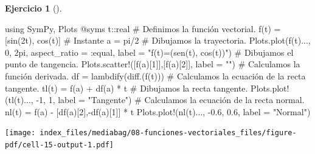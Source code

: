 \documentclass[
  a4paper,
]{scrreport}
\newenvironment{Shaded}{\begin{snugshade}}{\end{snugshade}}
\newcommand{\BuiltInTok}[1]{\textcolor[rgb]{0.00,0.23,0.31}{#1}}
\newcommand{\CommentTok}[1]{\textcolor[rgb]{0.37,0.37,0.37}{#1}}
\newcommand{\ConstantTok}[1]{\textcolor[rgb]{0.56,0.35,0.01}{#1}}
\newcommand{\DataTypeTok}[1]{\textcolor[rgb]{0.68,0.00,0.00}{#1}}
\newcommand{\FloatTok}[1]{\textcolor[rgb]{0.68,0.00,0.00}{#1}}
\newcommand{\FunctionTok}[1]{\textcolor[rgb]{0.28,0.35,0.67}{#1}}
\newcommand{\ImportTok}[1]{\textcolor[rgb]{0.00,0.46,0.62}{#1}}
\newcommand{\NormalTok}[1]{\textcolor[rgb]{0.00,0.23,0.31}{#1}}
\newcommand{\OperatorTok}[1]{\textcolor[rgb]{0.37,0.37,0.37}{#1}}
\newcommand{\PreprocessorTok}[1]{\textcolor[rgb]{0.68,0.00,0.00}{#1}}
\newcommand{\StringTok}[1]{\textcolor[rgb]{0.13,0.47,0.30}{#1}}
\theoremstyle{definition}
\newtheorem{exercise}{Ejercicio}[chapter]
\theoremstyle{remark}
\begin{document}
\begin{exercise}[]
\begin{enumerate}
\begin{tcolorbox}
\begin{Shaded}
\begin{Highlighting}[]
\ImportTok{using} \BuiltInTok{SymPy}\NormalTok{, }\BuiltInTok{Plots}
\PreprocessorTok{@syms}\NormalTok{ t}\OperatorTok{::}\DataTypeTok{real}
\CommentTok{\# Definimos la función vectorial.}
\FunctionTok{f}\NormalTok{(t) }\OperatorTok{=}\NormalTok{ [}\FunctionTok{sin}\NormalTok{(}\FloatTok{2}\NormalTok{t), }\FunctionTok{cos}\NormalTok{(t)]}
\CommentTok{\# Instante }
\NormalTok{a }\OperatorTok{=} \ConstantTok{pi}\OperatorTok{/}\FloatTok{2}
\CommentTok{\# Dibujamos la trayectoria.}
\NormalTok{Plots.}\FunctionTok{plot}\NormalTok{(}\FunctionTok{f}\NormalTok{(t)}\OperatorTok{...}\NormalTok{, }\FloatTok{0}\NormalTok{, }\FloatTok{2}\NormalTok{pi, aspect\_ratio }\OperatorTok{=} \OperatorTok{:}\NormalTok{equal, label }\OperatorTok{=} \StringTok{"f(t)=(sen(t), cos(t))"}\NormalTok{)}
\CommentTok{\# Dibujamos el punto de tangencia.}
\NormalTok{Plots.}\FunctionTok{scatter!}\NormalTok{([}\FunctionTok{f}\NormalTok{(a)[}\FloatTok{1}\NormalTok{]],[}\FunctionTok{f}\NormalTok{(a)[}\FloatTok{2}\NormalTok{]], label }\OperatorTok{=} \StringTok{""}\NormalTok{)}
\CommentTok{\# Calculamos la función derivada.}
\NormalTok{df }\OperatorTok{=} \FunctionTok{lambdify}\NormalTok{(}\FunctionTok{diff}\NormalTok{.(}\FunctionTok{f}\NormalTok{(t)))}
\CommentTok{\# Calculamos la ecuación de la recta tangente.}
\FunctionTok{tl}\NormalTok{(t) }\OperatorTok{=} \FunctionTok{f}\NormalTok{(a) }\OperatorTok{+} \FunctionTok{df}\NormalTok{(a) }\OperatorTok{*}\NormalTok{ t}
\CommentTok{\# Dibujamos la recta tangente.}
\NormalTok{Plots.}\FunctionTok{plot!}\NormalTok{(}\FunctionTok{tl}\NormalTok{(t)}\OperatorTok{...}\NormalTok{, }\OperatorTok{{-}}\FloatTok{1}\NormalTok{, }\FloatTok{1}\NormalTok{, label }\OperatorTok{=} \StringTok{"Tangente"}\NormalTok{)}
\CommentTok{\# Calculamos la ecuación de la recta normal.}
\FunctionTok{nl}\NormalTok{(t) }\OperatorTok{=} \FunctionTok{f}\NormalTok{(a) }\OperatorTok{{-}}\NormalTok{ [}\FunctionTok{df}\NormalTok{(a)[}\FloatTok{2}\NormalTok{],}\FunctionTok{{-}df}\NormalTok{(a)[}\FloatTok{1}\NormalTok{]] }\OperatorTok{*}\NormalTok{ t}
\NormalTok{Plots.}\FunctionTok{plot!}\NormalTok{(}\FunctionTok{nl}\NormalTok{(t)}\OperatorTok{...}\NormalTok{, }\OperatorTok{{-}}\FloatTok{0.6}\NormalTok{, }\FloatTok{0.6}\NormalTok{, label }\OperatorTok{=} \StringTok{"Normal"}\NormalTok{)}
\end{Highlighting}
\end{Shaded}

  \texttt{[image: index\_files/mediabag/08-funciones-vectoriales\_files/figure-pdf/cell-15-output-1.pdf]}


\end{tcolorbox}
\end{enumerate}
\end{exercise}
\end{document}
